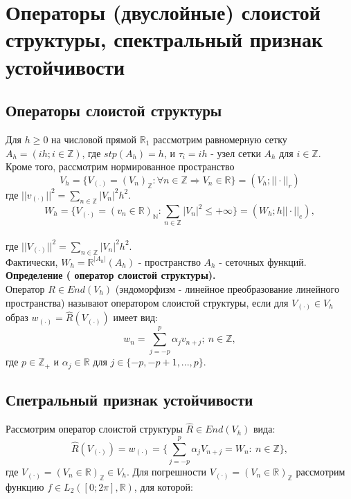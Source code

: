 \documentclass[__main__.tex]{subfiles}
\begin{document}
\section{Операторы (двуслойные) слоистой структуры, спектральный признак устойчивости}
\subsection*{Операторы слоистой структуры}
Для $h \geq 0$ на числовой прямой $ \mathbb{R}_1$ рассмотрим равномерную сетку $A_h = (ih ; i \in \mathbb{Z})$, где $stp(A_h) = h$, и $\tau_i = ih$ - узел сетки $A_h$ для $i \in \mathbb{Z}$.\\
Кроме того, рассмотрим нормированное пространство \\
$$ V_h = \{ V_{(.)} = (V_n)_{\mathbb{Z}} : \forall  n \in \mathbb{Z} \Rightarrow V_n \in \mathbb{R} \} = (V_h ; ||\cdot||_r)$$
где $||v_{(\cdot)}||^2 = \sum_{n \in \mathbb{Z}} |V_n|^2h^2$. \\
$$W_h = \{ V_{(\cdot)} = (v_n \in \mathbb{R})_{\mathbb{N}} : \sum_{n \in \mathbb{Z}} |V_n|^2 \leq +\infty \} = (W_h ; h||\cdot||_e),$$ \\
где $||V_{(\cdot)}||^2 = \sum_{n \in \mathbb{Z}} |V_n|^2h^2$. \\
Фактически, $W_h = \mathbb{R}^{|A_h|} (A_h)$ - пространство $A_h$ - сеточных функций. \\

\textbf{Определение ( оператор слоистой структуры).} \\

Оператор $ R \in End(V_h)$ (эндоморфизм - линейное преобразование линейного пространства) называют оператором слоистой структуры, если для $V_{(\cdot)} \in V_h$
образ $w_{(\cdot)} = \hat{R}(V_{(\cdot)})$ имеет вид:
$$ w_n = \sum_{j = -p}^{p} \alpha_j v_{n+j}; \  n \in \mathbb{Z},$$
где $p \in \mathbb{Z}_{+}$ и $\alpha_j \in \mathbb{R}$ для $ j \in \{ -p, -p+1, ..., p\}$.

\subsection*{Спетральный признак устойчивости}
Рассмотрим оператор слоистой структуры $\hat{R} \in End(V_h)$ вида:
$$ \hat{R}(V_{(\cdot)}) = w_{(\cdot)} = \{ \sum_{j = -p}^{p} \alpha_j V_{n+j} = W_n : \ n \in \mathbb{Z}\},$$
где $V_{(\cdot)} = (V_n \in \mathbb{R})_{\mathbb{Z}} \in V_h$.
Для погрешности $V_{(\cdot)} = (V_n \in \mathbb{R})_{\mathbb{Z}}$ рассмотрим функцию $f \in L_2([0;2\pi],\mathbb{R})$, для которой:
\end{document}
